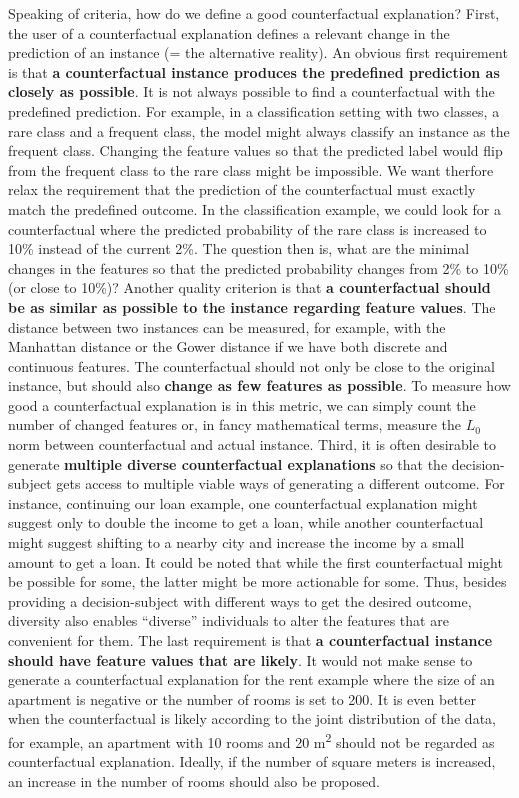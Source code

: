 \documentclass[
  12pt,
]{krantz}
\begin{document}
Speaking of criteria, how do we define a good counterfactual explanation?
First, the user of a counterfactual explanation defines a relevant change in the prediction of an instance (= the alternative reality).
An obvious first requirement is that \textbf{a counterfactual instance produces the predefined prediction as closely as possible}.
It is not always possible to find a counterfactual with the predefined prediction.
For example, in a classification setting with two classes, a rare class and a frequent class, the model might always classify an instance as the frequent class.
Changing the feature values so that the predicted label would flip from the frequent class to the rare class might be impossible.
We want therfore relax the requirement that the prediction of the counterfactual must exactly match the predefined outcome.
In the classification example, we could look for a counterfactual where the predicted probability of the rare class is increased to 10\% instead of the current 2\%.
The question then is, what are the minimal changes in the features so that the predicted probability changes from 2\% to 10\% (or close to 10\%)?
Another quality criterion is that \textbf{a counterfactual should be as similar as possible to the instance regarding feature values}.
The distance between two instances can be measured, for example, with the Manhattan distance or the Gower distance if we have both discrete and continuous features.
The counterfactual should not only be close to the original instance, but should also \textbf{change as few features as possible}.
To measure how good a counterfactual explanation is in this metric, we can simply count the number of changed features or, in fancy mathematical terms, measure the \(L_0\) norm between counterfactual and actual instance.
Third, it is often desirable to generate \textbf{multiple diverse counterfactual explanations} so that the decision-subject gets access to multiple viable ways of generating a different outcome. For instance, continuing our loan example, one counterfactual explanation might suggest only to double the income to get a loan, while another counterfactual might suggest shifting to a nearby city and increase the income by a small amount to get a loan. It could be noted that while the first counterfactual might be possible for some, the latter might be more actionable for some. Thus, besides providing a decision-subject with different ways to get the desired outcome, diversity also enables ``diverse'' individuals to alter the features that are convenient for them.
The last requirement is that \textbf{a counterfactual instance should have feature values that are likely}.
It would not make sense to generate a counterfactual explanation for the rent example where the size of an apartment is negative or the number of rooms is set to 200.
It is even better when the counterfactual is likely according to the joint distribution of the data, for example, an apartment with 10 rooms and 20 m\textsuperscript{2} should not be regarded as counterfactual explanation.
Ideally, if the number of square meters is increased, an increase in the number of rooms should also be proposed.
\end{document}

